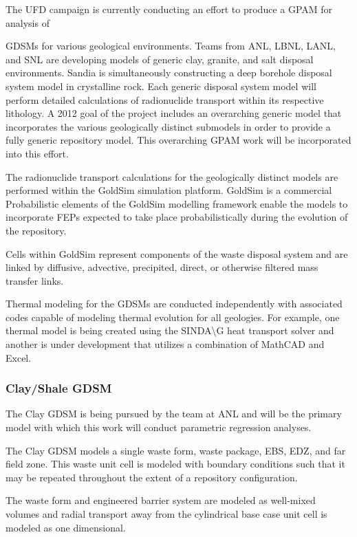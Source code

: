 The \gls{UFD} campaign is currently conducting an effort to produce
a \acrlong{GPAM} for analysis of {\glspl{GDSM} for various geological environments. 
Teams from \acrlong{ANL}, \acrlong{LBNL}, \acrlong{LANL}, and \acrlong{SNL} are developing
models of generic clay, granite, and salt disposal environments. Sandia is
simultaneously constructing a deep borehole disposal system model in crystalline 
rock. Each generic disposal system model will perform detailed calculations of 
radionuclide transport within its respective lithology. A 2012 goal of the 
project includes an overarching generic model that incorporates the various 
geologically distinct submodels in order to provide a fully generic repository 
model. This overarching \gls{GPAM} work will be incorporated into this effort.

The radionuclide transport calculations for the geologically distinct models 
are performed within the GoldSim simulation platform. GoldSim is a commercial
Probabilistic elements of the GoldSim modelling framework enable the models to 
incorporate \gls{FEPs} expected to take place probabilistically during the 
evolution of the repository.  

Cells within GoldSim represent components of the waste disposal system and
are linked by diffusive, advective, precipited, direct, or  otherwise filtered
mass transfer links. 

Thermal modeling for the \glspl{GDSM} are conducted independently with 
associated codes capable of modeling thermal evolution for all geologies. For 
example, one thermal model is being created using the SINDA\textbackslash G heat
transport solver and another is under development that utilizes a combination 
of MathCAD and Excel. 

\subsubsection{Clay/Shale GDSM}

The Clay \gls{GDSM} is being pursued by the team at \gls{ANL} and will be 
the primary model with which this work will conduct parametric regression 
analyses. 

The Clay \gls{GDSM} models a single waste form, waste package, \gls{EBS}, 
\gls{EDZ}, and far field zone. This waste unit cell is modeled with boundary 
conditions such that it may be repeated throughout the extent of a repository 
configuration. 

The waste form and engineered barrier system are modeled as well-mixed volumes 
and radial transport away from the cylindrical base case unit cell is modeled as  
one dimensional.

}
